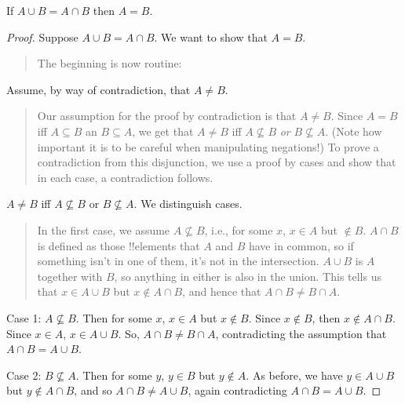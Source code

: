 \documentclass[../../../include/open-logic-section]{subfiles}
\begin{document}
\begin{prop}
If $A \cup B = A \cap B$ then $A = B$.
\end{prop}

\begin{proof}
  Suppose $A \cup B = A \cap B$. We want to show that $A = B$.
  \begin{quote}
    The beginning is now routine:
  \end{quote}
  Assume, by way of contradiction, that $A \neq B$.
  \begin{quote}
    Our assumption for the proof by contradiction is that $A \neq
    B$. Since $A = B$ iff $A \subseteq B$ an $B \subseteq A$, we get
    that $A \neq B$ iff $A \nsubseteq B$ \emph{or} $B \nsubseteq
    A$. (Note how important it is to be careful when manipulating
    negations!{}) To prove a contradiction from this disjunction, we
    use a proof by cases and show that in each case, a contradiction
    follows.
  \end{quote}
  $A \neq B$ iff $A \nsubseteq B$ or $B \nsubseteq A$. We distinguish
  cases.
  \begin{quote}
    In the first case, we assume $A \nsubseteq B$, i.e., for some $x$,
    $x \in A$ but $\notin B$. $A \cap B$ is defined as those
    !!{element}s that $A$ and $B$ have in common, so if something
    isn't in one of them, it's not in the intersection. $A \cup B$ is
    $A$ together with $B$, so anything in either is also in the
    union. This tells us that $x \in A \cup B$ but $x \notin A \cap
    B$, and hence that $A \cap B \neq B \cap A$.
  \end{quote}
  
  Case 1: $A \nsubseteq B$. Then for some $x$, $x \in A$ but $x \notin
  B$. Since $x \notin B$, then $x \notin A \cap B$. Since $x \in A$,
  $x \in A \cup B$. So, $A \cap B \neq B \cap A$, contradicting the
  assumption that $A \cap B = A \cup B$.

  Case 2: $B \nsubseteq A$. Then for some $y$, $y \in B$ but $y \notin
  A$. As before, we have $y \in A \cup B$ but $y \notin A \cap B$, and
  so $A \cap B \neq A \cup B$, again contradicting $A \cap B = A \cup
  B$. 
\end{proof}
\end{document}
